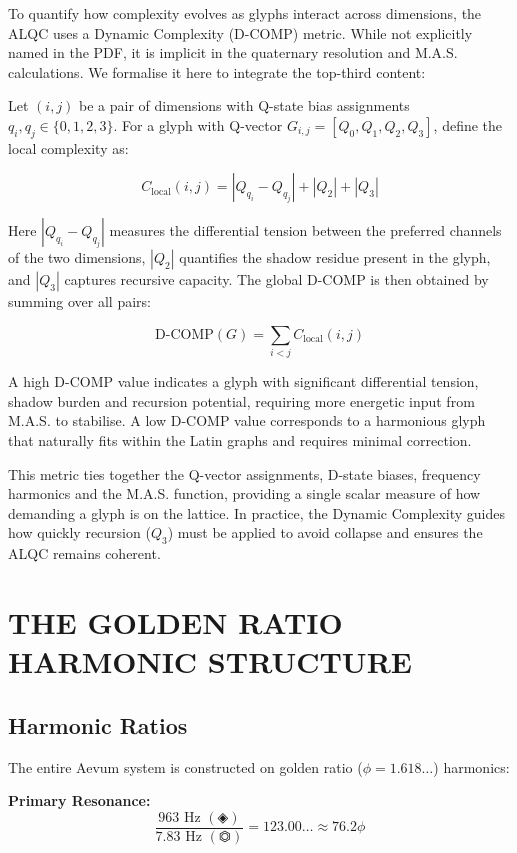 \documentclass[11pt, letterpaper]{article}
\begin{document}
To quantify how complexity evolves as glyphs interact across dimensions, the ALQC uses a Dynamic Complexity (D-COMP) metric. While not explicitly named in the PDF, it is implicit in the quaternary resolution and M.A.S. calculations. We formalise it here to integrate the top-third content:

Let $(i,j)$ be a pair of dimensions with Q-state bias assignments $q_i, q_j \in \{0,1,2,3\}$. For a glyph with Q-vector $G_{i,j}=[Q_0,Q_1,Q_2,Q_3]$, define the local complexity as:

\[
C_{\mathrm{local}}(i, j) = |Q_{q_i} - Q_{q_j}| + |Q_2| + |Q_3|
\]

Here $|Q_{q_i} - Q_{q_j}|$ measures the differential tension between the preferred channels of the two dimensions, $|Q_2|$ quantifies the shadow residue present in the glyph, and $|Q_3|$ captures recursive capacity. The global D-COMP is then obtained by summing over all pairs:

\[
\mathrm{D\text{-}COMP}(G) = \sum_{i<j} C_{\mathrm{local}}(i, j)
\]

A high D-COMP value indicates a glyph with significant differential tension, shadow burden and recursion potential, requiring more energetic input from M.A.S. to stabilise. A low D-COMP value corresponds to a harmonious glyph that naturally fits within the Latin graphs and requires minimal correction.

This metric ties together the Q-vector assignments, D-state biases, frequency harmonics and the M.A.S. function, providing a single scalar measure of how demanding a glyph is on the lattice. In practice, the Dynamic Complexity guides how quickly recursion ($Q_3$) must be applied to avoid collapse and ensures the ALQC remains coherent.

\section{THE GOLDEN RATIO HARMONIC STRUCTURE}\label{sec:partIX}

\subsection{Harmonic Ratios}\label{sec:9.1}

The entire Aevum system is constructed on golden ratio ($\phi = 1.618\dots$) harmonics:

\textbf{Primary Resonance:}
\[
\frac{963 \text{ Hz } (\text{◈})}{7.83 \text{ Hz } (\text{⏣})} = 123.00\dots \approx 76.2\phi
\]
\end{document}
